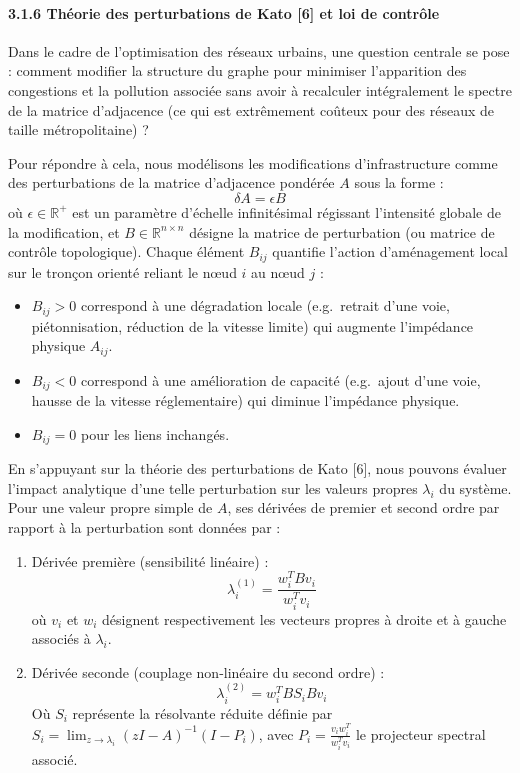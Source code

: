 \documentclass[10pt, a4paper]{article}
\providecommand{\tightlist}{}
\begin{document}
\paragraph{3.1.6 Théorie des perturbations de Kato {[}6{]} et loi de
contrôle}\label{thuxe9orie-des-perturbations-de-kato-6-et-loi-de-contruxf4le}

Dans le cadre de l'optimisation des réseaux urbains, une question
centrale se pose : comment modifier la structure du graphe pour
minimiser l'apparition des congestions et la pollution associée sans
avoir à recalculer intégralement le spectre de la matrice d'adjacence
(ce qui est extrêmement coûteux pour des réseaux de taille
métropolitaine) ?

Pour répondre à cela, nous modélisons les modifications d'infrastructure
comme des perturbations de la matrice d'adjacence pondérée \(A\) sous la
forme : \[\delta A = \epsilon B\] où \(\epsilon \in \mathbb{R}^+\) est
un paramètre d'échelle infinitésimal régissant l'intensité globale de la
modification, et \(B \in \mathbb{R}^{n \times n}\) désigne la matrice de
perturbation (ou matrice de contrôle topologique). Chaque élément
\(B_{ij}\) quantifie l'action d'aménagement local sur le tronçon orienté
reliant le nœud \(i\) au nœud \(j\) :

\begin{itemize}
\tightlist
\item
  \(B_{ij} > 0\) correspond à une dégradation locale (e.g.~retrait d'une
  voie, piétonnisation, réduction de la vitesse limite) qui augmente
  l'impédance physique \(A_{ij}\).
\item
  \(B_{ij} < 0\) correspond à une amélioration de capacité (e.g.~ajout
  d'une voie, hausse de la vitesse réglementaire) qui diminue
  l'impédance physique.
\item
  \(B_{ij} = 0\) pour les liens inchangés.
\end{itemize}

En s'appuyant sur la théorie des perturbations de Kato {[}6{]}, nous
pouvons évaluer l'impact analytique d'une telle perturbation sur les
valeurs propres \(\lambda_i\) du système. Pour une valeur propre simple
de \(A\), ses dérivées de premier et second ordre par rapport à la
perturbation sont données par :

\begin{enumerate}
\def\labelenumi{\arabic{enumi}.}
\item
  Dérivée première (sensibilité linéaire) :
  \[\lambda_i^{(1)} = \frac{w_i^T B v_i}{w_i^T v_i}\] où \(v_i\) et
  \(w_i\) désignent respectivement les vecteurs propres à droite et à
  gauche associés à \(\lambda_i\).
\item
  Dérivée seconde (couplage non-linéaire du second ordre) :
  \[\lambda_i^{(2)} = w_i^T B S_i B v_i\] Où \(S_i\) représente la
  résolvante réduite définie par
  \(S_i = \lim_{z \to \lambda_i} (zI - A)^{-1}(I - P_i)\), avec
  \(P_i = \frac{v_i w_i^T}{w_i^T v_i}\) le projecteur spectral associé.
\end{enumerate}
\end{document}
